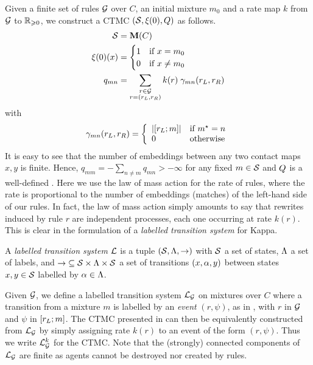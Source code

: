 Given a finite set of rules $\mathcal{G}$ over $C$,
an initial mixture $m_0$
and a rate map $k$ from $\mathcal{G}$ to $\mathbb{R}_{\geqslant 0}$,
we construct a CTMC $\left(\mathcal{S}, \xi(0), Q\right)$ as follows.
\begin{align}
  \label{eq:kappa-ctmc}
  \mathcal{S} &= \mathbf{M}(C) \nonumber \\
  \xi(0)(x) &= \begin{cases}
    1 \quad\text{if } x = m_0 \\
    0 \quad\text{if } x \neq m_0
  \end{cases} \\
  q_{mn} &= \sum_{\substack{r \in \mathcal{G}\\r = \left(r_L,r_R\right)}}
    k(r) \; \gamma_{mn}(r_L,r_R) \nonumber
\end{align}
with
\begin{equation*}
  \gamma_{mn}(r_L,r_R) = \left\{\begin{array}{ll}
    \left\lvert \left[r_L;m\right] \right\rvert & \text{if } m^\star = n \\
    0 & \text{otherwise}
  \end{array}\right.
\end{equation*}
It is easy to see that the number of embeddings
between any two contact maps $x,y$ is finite.
Hence, $q_{mm} = -\sum_{n \neq m} q_{mn} > -\infty$
for any fixed $m \in \mathcal{S}$
and $Q$ is a well-defined \qmatrix.
Here we use the law of mass action for the rate of rules,
where the rate is proportional to the number of embeddings (matches)
of the left-hand side of our rules.
In fact, the law of mass action simply amounts to say that
rewrites induced by rule $r$ are independent processes,
each one occurring at rate $k(r)$.
This is clear in the formulation of
a \emph{labelled transition system} for Kappa.

\begin{definition}
  A \emph{labelled transition system} $\mathcal{L}$ is a tuple
  $\left(\mathcal{S},\Lambda,\to\right)$ with
  $\mathcal{S}$ a set of states,
  $\Lambda$ a set of labels,
  and $\to\; \subseteq \mathcal{S} \times \Lambda \times \mathcal{S}$
  a set of transitions $\left(x,\alpha,y\right)$
  between states $x,y \in \mathcal{S}$
  labelled by $\alpha \in \Lambda$.
\end{definition}

Given $\mathcal{G}$,
we define a labelled transition system $\mathcal{L}_{\mathcal{G}}$
on mixtures over $C$ where
a transition from a mixture $m$ is labelled by
an \emph{event} $(r,\psi)$, as in ,
with $r$ in $\mathcal{G}$ and $\psi$ in $\left[r_L;m\right]$.
The CTMC presented in  can then be equivalently
constructed from $\mathcal{L}_{\mathcal{G}}$ by simply assigning
rate $k(r)$ to an event of the form $(r,\psi)$.
Thus we write $\mathcal{L}^k_{\mathcal{G}}$ for the CTMC.
Note that the (strongly) connected components of $\mathcal{L}_{\mathcal{G}}$
are finite as agents cannot be destroyed nor created by rules.


